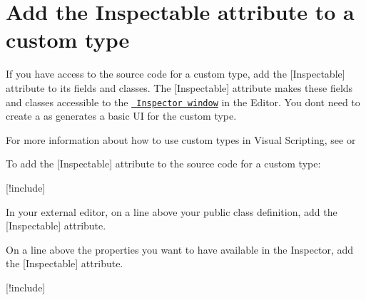 \chapter{Add the Inspectable attribute to a custom type}
\hypertarget{md__library_2_package_cache_2com_8unity_8visualscripting_0d1_89_82_2_documentation_0i_2vs-add-in236feef24f71ab25a6e4653d6791c5ef}{}\label{md__library_2_package_cache_2com_8unity_8visualscripting_0d1_89_82_2_documentation_0i_2vs-add-in236feef24f71ab25a6e4653d6791c5ef}
\label{md__library_2_package_cache_2com_8unity_8visualscripting_0d1_89_82_2_documentation_0i_2vs-add-in236feef24f71ab25a6e4653d6791c5ef_autotoc_md1654}%
%
 If you have access to the source code for a custom type, add the {\ttfamily \mbox{[}Inspectable\mbox{]}} attribute to its fields and classes. The {\ttfamily \mbox{[}Inspectable\mbox{]}} attribute makes these fields and classes accessible to the \href{https://docs.unity3d.com/Manual/UsingTheInspector.html}{\texttt{ Inspector window}} in the  Editor. You don\textquotesingle{}t need to create a  as  generates a basic UI for the custom type.

For more information about how to use custom types in Visual Scripting, see  or 

To add the {\ttfamily \mbox{[}Inspectable\mbox{]}} attribute to the source code for a custom type\+:


\begin{DoxyEnumerate}
\item \mbox{[}!include\mbox{]}
\item In your external editor, on a line above your {\ttfamily public class} definition, add the {\ttfamily \mbox{[}Inspectable\mbox{]}} attribute.
\end{DoxyEnumerate}
\begin{DoxyEnumerate}
\item On a line above the properties you want to have available in the  Inspector, add the {\ttfamily \mbox{[}Inspectable\mbox{]}} attribute.
\end{DoxyEnumerate}
\begin{DoxyEnumerate}
\item \mbox{[}!include\mbox{]}
\end{DoxyEnumerate}

